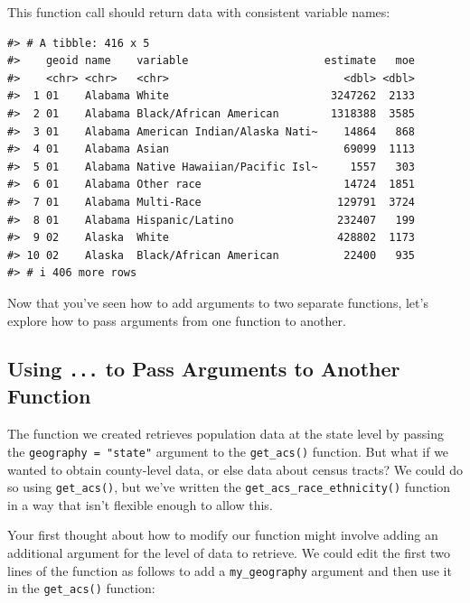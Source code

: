 \documentclass[
]{book}
\begin{document}
This function call should return data with consistent variable names:

\begin{verbatim}
#> # A tibble: 416 x 5
#>    geoid name    variable                     estimate   moe
#>    <chr> <chr>   <chr>                           <dbl> <dbl>
#>  1 01    Alabama White                         3247262  2133
#>  2 01    Alabama Black/African American        1318388  3585
#>  3 01    Alabama American Indian/Alaska Nati~    14864   868
#>  4 01    Alabama Asian                           69099  1113
#>  5 01    Alabama Native Hawaiian/Pacific Isl~     1557   303
#>  6 01    Alabama Other race                      14724  1851
#>  7 01    Alabama Multi-Race                     129791  3724
#>  8 01    Alabama Hispanic/Latino                232407   199
#>  9 02    Alaska  White                          428802  1173
#> 10 02    Alaska  Black/African American          22400   935
#> # i 406 more rows
\end{verbatim}

Now that you've seen how to add arguments to two separate functions, let's explore how to pass arguments from one function to another.

\hypertarget{using-...-to-pass-arguments-to-another-function}{%
\subsection*{\texorpdfstring{Using \texttt{...} to Pass Arguments to Another Function}{Using ... to Pass Arguments to Another Function}}\label{using-...-to-pass-arguments-to-another-function}}

The function we created retrieves population data at the state level by passing the \texttt{geography\ =\ "state"} argument to the \texttt{get\_acs()} function. But what if we wanted to obtain county-level data, or else data about census tracts? We could do so using \texttt{get\_acs()}, but we've written the \texttt{get\_acs\_race\_ethnicity()} function in a way that isn't flexible enough to allow this.

Your first thought about how to modify our function might involve adding an additional argument for the level of data to retrieve. We could edit the first two lines of the function as follows to add a \texttt{my\_geography} argument and then use it in the \texttt{get\_acs()} function:
\end{document}
